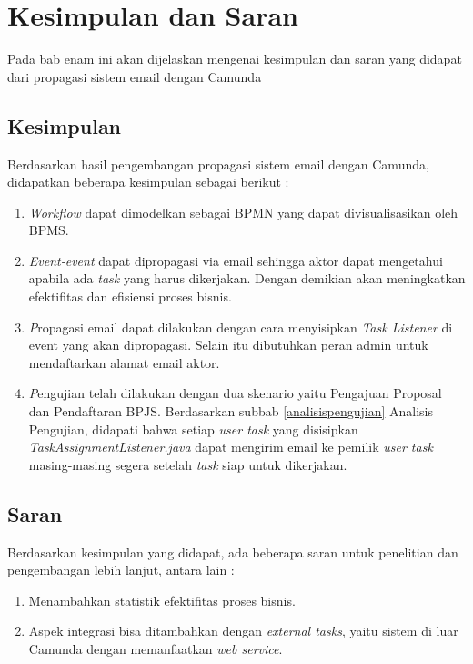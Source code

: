 \chapter{Kesimpulan dan Saran}
\label{chap:kesimpulan_saran}
Pada bab enam ini akan dijelaskan mengenai kesimpulan dan saran yang didapat dari propagasi sistem email dengan Camunda 
\section{Kesimpulan}
\label{sec:kesimpulan}
Berdasarkan hasil pengembangan propagasi sistem email dengan Camunda, didapatkan beberapa kesimpulan sebagai berikut :
\begin{enumerate}
	\item \textit{Workflow} dapat dimodelkan sebagai BPMN yang dapat divisualisasikan oleh BPMS. 
	\item \textit{Event-event} dapat dipropagasi via email sehingga aktor dapat mengetahui apabila ada \textit{task} yang harus dikerjakan. Dengan demikian akan meningkatkan efektifitas dan efisiensi proses bisnis.
	\item \textit Propagasi email dapat dilakukan dengan cara menyisipkan \textit{Task Listener} di event yang akan dipropagasi. Selain itu dibutuhkan peran admin untuk mendaftarkan alamat email aktor.
	\item \textit Pengujian telah dilakukan dengan dua skenario yaitu Pengajuan Proposal dan Pendaftaran BPJS. Berdasarkan subbab \ref{analisispengujian} Analisis Pengujian, didapati bahwa setiap \textit{user task} yang disisipkan \textit{TaskAssignmentListener.java} dapat mengirim email ke pemilik \textit{user task} masing-masing segera setelah \textit{task} siap untuk dikerjakan.
	

\end{enumerate}

\section{Saran}
\label{sec:saran}
Berdasarkan kesimpulan yang didapat, ada beberapa saran untuk penelitian dan pengembangan lebih lanjut, antara lain :
\begin{enumerate}
	\item Menambahkan statistik efektifitas proses bisnis.
	\item Aspek integrasi bisa ditambahkan dengan \textit{external tasks}, yaitu sistem di luar Camunda dengan memanfaatkan \textit{web service}.
\end{enumerate}